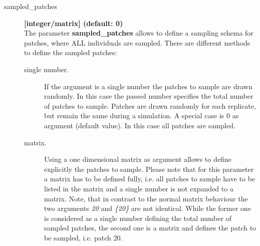 \documentclass[letterpaper,12pt,oneside]{book}
\begin{document}
\begin{description}
\item[sampled\_patches] \textbf{[integer/matrix] (default: 0)}\\ 
The parameter \textbf{sampled\_patches} allows to define a sampling schema for patches, where ALL individuals are sampled. There are different methods to define the sampled patches:
\begin{description}
\item[single number.] If the argument is a single number the patches to sample are drawn randomly. In this case the passed number specifies the total number of patches to sample. Patches are drawn randomly for each replicate, but remain the same during a simulation. A special case is 0 as argument (default value). In this case all patches are sampled. 
\item[matrix.] Using a one dimensional matrix as argument allows to define explicitly the patches to sample. Please note that for this parameter a matrix has to be defined fully, i.e. all patches to sample have to be listed in the matrix and a single number is not expanded to a matrix. Note, that in contrast to the normal matrix behaviour the two arguments \textit{20} and \textit{\{20\}} are not identical. While the former one is considered as a single number defining the total number of sampled patches, the second one is a matrix and defines the patch to be sampled, i.e. patch 20.  
\end{description}


\end{description}
\end{document}

